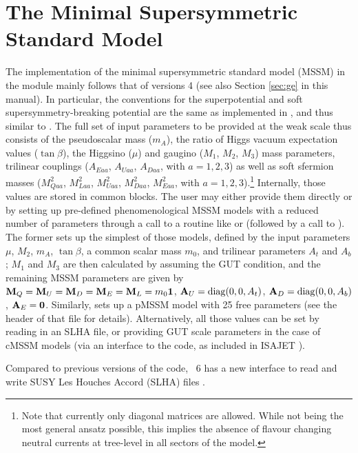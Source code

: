 \chapter{The Minimal Supersymmetric Standard Model}

The implementation of the minimal supersymmetric standard model (MSSM)
in the module  mainly follows that of \ds versions 4 \cite{ds4}
(see also Section \ref{sec:ge} in this manual). 
In particular, the conventions 
for the superpotential and soft supersymmetry-breaking potential are the same as 
implemented in \cite{Bergstrom:1995cz}, and thus similar to \cite{Haber:1984rc,Gunion:1984yn}.
The full set of input parameters to be provided at the weak scale thus consists of the 
pseudoscalar mass ($m_A$), 
the ratio of Higgs vacuum expectation values ($\tan\beta$), the Higgsino ($\mu$) and 
gaugino ($M_1$, $M_2$, $M_3$) mass parameters, trilinear couplings ($A_{Eaa}$,
$A_{Uaa}$, $A_{Daa}$, with $a=1,2,3$) as well as  soft sfermion masses ($M^2_{Qaa}$, 
$M^2_{Laa}$, $M^2_{Uaa}$, $M^2_{Daa}$, $M^2_{Eaa}$, with $a=1,2,3$).\footnote{
Note that currently only diagonal matrices are allowed.  While not being the most general
ansatz possible, this implies the absence of flavour changing neutral currents at tree-level  
in all sectors of the model.
}
Internally, those values are stored in  common blocks. The user may either 
provide them directly or by setting up pre-defined phenomenological MSSM models
with a reduced number of parameters
through a call to a routine like  or  
(followed by a call to ). The 
former sets up the simplest of those models, defined by the input parameters  
$\mu$, $M_2$, $m_A$, $\tan\beta$, a common scalar mass $m_0$, and trilinear 
parameters $A_t$ and $A_b$; $M_1$ and $M_3$ are then calculated by assuming the 
GUT condition, and the remaining MSSM parameters are 
 given by ${\bf M}_Q = {\bf M}_U = {\bf M}_D = {\bf M}_E = {\bf M}_L = m_0{\bf 1}$, 
 ${\bf A}_U = {\rm diag}(0,0,A_t)$, ${\bf A}_D = {\rm diag}(0,0,A_b)$, ${\bf A}_E = {\bf 0}$. 
 Similarly,  sets up a pMSSM model with 25 free parameters
 (see the header of that file for details). Alternatively, all those values can be set by 
 reading in an SLHA file, or providing GUT scale parameters in the case of cMSSM
 models (via an interface to the  code, as included in ISAJET \cite{Paige:2003mg,isajet_www}).
 
Compared to previous versions of the code, \ds\ 6 has a new interface to read and write SUSY 
Les Houches Accord (SLHA) files \cite{Skands:2003cj,Allanach:2008qq}. 
 

